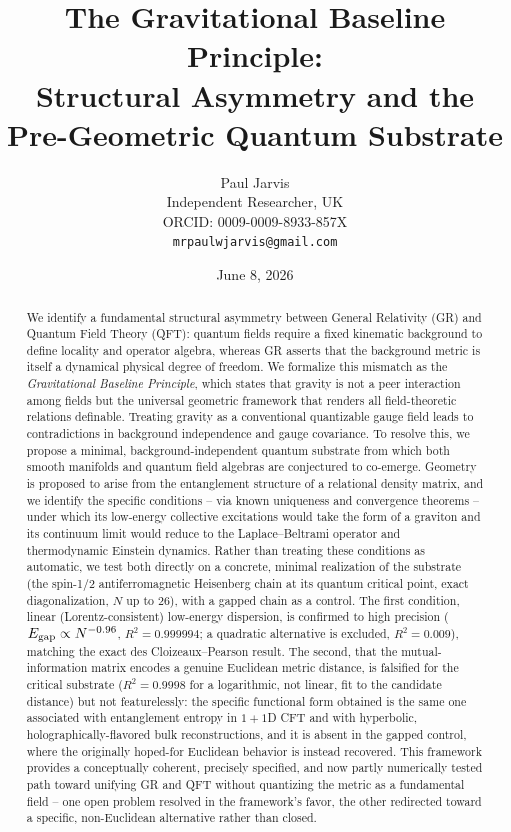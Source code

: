 \documentclass[11pt]{article}
\title{The Gravitational Baseline Principle:\\
Structural Asymmetry and the\\
Pre-Geometric Quantum Substrate}
\author{Paul Jarvis \\
Independent Researcher, UK \\
ORCID: 0009-0009-8933-857X \\
\texttt{mrpaulwjarvis@gmail.com}}
\date{June 8, 2026}
\begin{document}
\maketitle

\begin{abstract}
We identify a fundamental structural asymmetry between General Relativity (GR) and Quantum Field Theory (QFT): quantum fields require a fixed kinematic background to define locality and operator algebra, whereas GR asserts that the background metric is itself a dynamical physical degree of freedom. We formalize this mismatch as the \emph{Gravitational Baseline Principle}, which states that gravity is not a peer interaction among fields but the universal geometric framework that renders all field-theoretic relations definable. Treating gravity as a conventional quantizable gauge field leads to contradictions in background independence and gauge covariance. To resolve this, we propose a minimal, background-independent quantum substrate from which both smooth manifolds and quantum field algebras are conjectured to co-emerge. Geometry is proposed to arise from the entanglement structure of a relational density matrix, and we identify the specific conditions -- via known uniqueness and convergence theorems -- under which its low-energy collective excitations would take the form of a graviton and its continuum limit would reduce to the Laplace--Beltrami operator and thermodynamic Einstein dynamics. Rather than treating these conditions as automatic, we test both directly on a concrete, minimal realization of the substrate (the spin-1/2 antiferromagnetic Heisenberg chain at its quantum critical point, exact diagonalization, $N$ up to 26), with a gapped chain as a control. The first condition, linear (Lorentz-consistent) low-energy dispersion, is confirmed to high precision ($E_{\rm gap}\propto N^{-0.96}$, $R^2=0.999994$; a quadratic alternative is excluded, $R^2=0.009$), matching the exact des Cloizeaux--Pearson result. The second, that the mutual-information matrix encodes a genuine Euclidean metric distance, is falsified for the critical substrate ($R^2=0.9998$ for a logarithmic, not linear, fit to the candidate distance) but not featurelessly: the specific functional form obtained is the same one associated with entanglement entropy in $1+1$D CFT and with hyperbolic, holographically-flavored bulk reconstructions, and it is absent in the gapped control, where the originally hoped-for Euclidean behavior is instead recovered. This framework provides a conceptually coherent, precisely specified, and now partly numerically tested path toward unifying GR and QFT without quantizing the metric as a fundamental field -- one open problem resolved in the framework's favor, the other redirected toward a specific, non-Euclidean alternative rather than closed.
\end{abstract}
\end{document}
